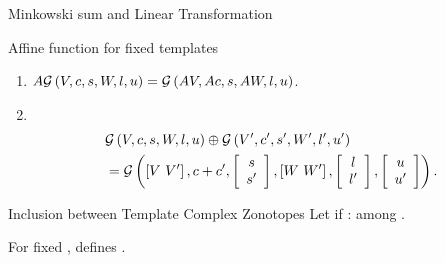 \begin{frame}{Minkowski sum and Linear Transformation}
\begin{block}{Affine function for fixed templates}
\begin{enumerate}
\item $A\mathcal{G}\left(V,c,s,W,l,u\right) = \mathcal{G}\left(AV,Ac,s,AW,l,u\right)$.
\item $~$\vspace{-2em}\hspace{-2em}\begin{align*}
&\mathcal{G}\left(V,c,s,W,l,u\right)\oplus\mathcal{G}\left(V^\prime,c^\prime,s^\prime,W^\prime,l^\prime,u^\prime\right)\\
&= \mathcal{G}\left(\left[V~V^\prime\right],c+c^\prime,\left[\begin{array}{c}{s}\\{s^\prime} \end{array}\right],\left[W~W^\prime\right],\left[\begin{array}{c}{l}\\{l^\prime} \end{array}\right],\left[\begin{array}{c}{u}\\{u^\prime} \end{array}\right]\right).
\end{align*}
\end{enumerate}
\end{block}
%
\end{frame}
%
\begin{frame}{Inclusion between Template Complex Zonotopes}
Let  if
: \eqncol{$(\order)\implies(\subseteq)$} among .
%
\begin{alertblock}{}
For fixed , \textcol{$\order$} defines .
\end{alertblock}
\end{frame}
%
